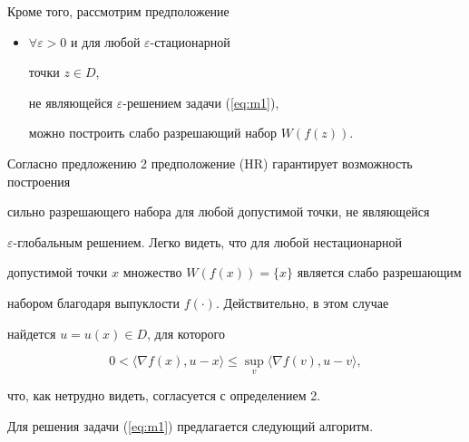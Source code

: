 Кроме того, рассмотрим предположение


\begin{itemize}


\item[(HR):] $\forall \varepsilon >0$ и для любой $\varepsilon$-стационарной


точки $z \in D$,


не являющейся $\varepsilon$-решением задачи (\ref{eq:m1}),


можно построить слабо разрешающий набор $W(f(z))$.


\end{itemize}


Согласно предложению 2 предположение (HR) гарантирует возможность построения


сильно разрешающего набора для любой допустимой точки, не являющейся


$\varepsilon$-глобальным решением. Легко видеть, что для любой нестационарной 


допустимой точки $x$ множество $W(f(x))=\{ x \}$ является слабо разрешающим


набором благодаря выпуклости $f(\cdot)$. Действительно, в этом случае 


найдется $u=u(x) \in D $, для которого


$$


0< \langle \nabla f(x),u-x \rangle \leq 


\sup_{v} \langle \nabla f(v),u-v \rangle ,


$$ 


что, как нетрудно видеть, согласуется с определением 2.





Для решения задачи (\ref{eq:m1}) предлагается следующий алгоритм.



